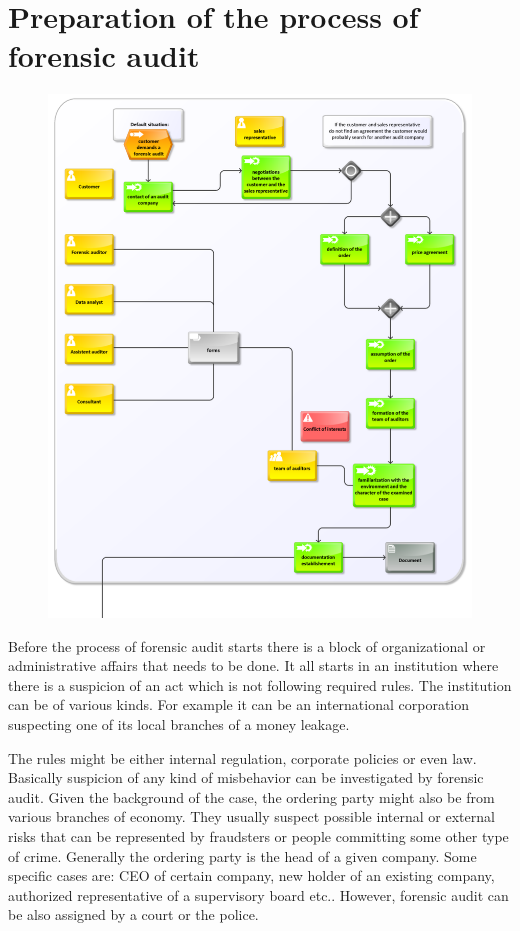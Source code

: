 \section{Preparation of the process of forensic audit}
\begin{figure}[hb!t]
	\begin{center} 
	\includegraphics[width=1.0\textwidth]{img/metodika/metodika1.pdf}
	\end{center}
\end{figure}
Before the process of forensic audit starts there is a block of organizational or administrative affairs that needs to be done. It all starts in an institution where there is a suspicion of an act which is not following required rules. The institution can be of various kinds. For example it can be an international corporation suspecting one of its local branches of a money leakage. %

The rules might be either internal regulation, corporate policies or even law. Basically suspicion of any kind of misbehavior can be investigated by forensic audit. Given the background of the case, the ordering party might also be from various branches of economy. They usually suspect possible internal or external risks that can be represented by fraudsters or people committing some other type of crime.  Generally the ordering party is the head of a given company. Some specific cases are: CEO of certain company, new holder of an existing company, authorized representative of a supervisory board etc.. However, forensic audit can be also assigned by a court or the police. 

